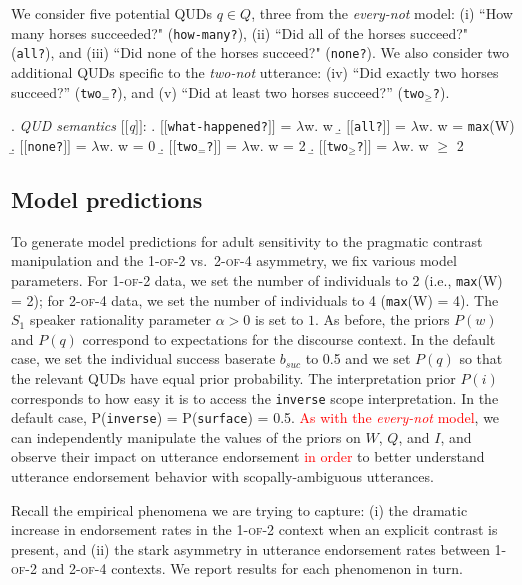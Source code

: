 \documentclass[preprint,authoryear]{elsarticle}\frenchspacing
\newcommand{\sem}[1]{\mbox{$[\![$#1$]\!]$}}
\newcommand{\lam}{\ensuremath{\lambda}}
\newcommand{\lp}[1]{\textcolor{red}{#1}} %
\begin{document}
We consider five potential QUDs $q \in Q$, three from the \emph{every-not} model:
(i) ``How many horses succeeded?" (\texttt{how-many?}), 
(ii) ``Did all of the horses succeed?" (\texttt{all?}), and 
(iii) ``Did none of the horses succeed?" (\texttt{none?}). We also consider two additional QUDs specific to the \emph{two-not} utterance:  (iv) ``Did exactly two horses succeed?'' (\texttt{two$_=$?}), and
(v) ``Did at least two horses succeed?'' (\texttt{two$_\geq$?}).

\ex. \label{ex:qud-sem} \emph{QUD semantics} \sem{\textit{q}}:
\a. \sem{\texttt{what-happened?}} = \lam w. w
\b. \sem{\texttt{all?}} = \lam w. w = \texttt{max}(W)
\b. \sem{\texttt{none?}} = \lam w. w = 0
\b. \sem{\texttt{two$_=$?}} = \lam w. w = 2
\b. \sem{\texttt{two$_\geq$?}} = \lam w. w $\geq$ 2


\subsection{Model predictions}

To generate model predictions for adult sensitivity to the pragmatic contrast manipulation and the  \textsc{1-of-2} vs.~\textsc{2-of-4} asymmetry, we fix various model parameters. For \textsc{1-of-2} data, we set the number of individuals to 2 (i.e., \texttt{max}(W) = 2); for \textsc{2-of-4} data, we set the number of individuals to 4 (\texttt{max}(W) = 4). The $S_1$ speaker rationality parameter $\alpha > 0$ is set to $1$. As before, the priors $P(w)$ and $P(q)$ correspond to expectations for the discourse context. In the default case, we set the individual success baserate $b_{suc}$ to 0.5 and we set $P(q)$ so that the relevant QUDs have equal prior probability. The interpretation prior $P(i)$ corresponds to how easy it is to access the \texttt{inverse} scope interpretation. In the default case, P(\texttt{inverse}) = P(\texttt{surface}) = 0.5. \lp{As with the \textit{every-not} model},  we can independently manipulate the values of the priors on $W$, $Q$, and $I$, and observe their impact on utterance endorsement
\lp{in order} to better understand utterance endorsement behavior with scopally-ambiguous utterances.

Recall the empirical phenomena we are trying to capture: (i) the dramatic increase in endorsement rates in the \textsc{1-of-2} context when an explicit contrast is present, and (ii) the stark asymmetry in utterance endorsement rates between \textsc{1-of-2} and \textsc{2-of-4} contexts. We report results for each phenomenon in turn.
\end{document}
